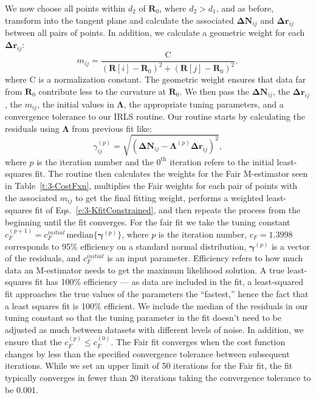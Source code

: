 We now choose all points within $d_2$ of $\mathbf{R}_0$, where $d_2 > d_1$, and as before, transform into the tangent plane and calculate the associated $\mathbf{\Delta N}_{ij}$ and $\mathbf{\Delta r}_{ij}$ between all pairs of points.
In addition, we calculate a geometric weight for each $\mathbf{\Delta r}_{ij}$:
\begin{equation}
  m_{ij} = \frac{\textrm{C}} {(\mathbf{R}[i] - \mathbf{R}_0)^2 + (\mathbf{R}[j]-\mathbf{R}_0)^2},
\end{equation}
where $\textrm{C}$ is a normalization constant.
The geometric weight ensures that data far from $\mathbf{R}_0$ contribute less to the curvature at $\mathbf{R}_0$.
We then pass the $\mathbf{\Delta N}_{ij}$, the $\mathbf{\Delta r}_{ij}$, the $m_{ij}$, the initial values in $\bm{\Lambda}$, the appropriate tuning parameters, and a convergence tolerance to our IRLS routine.
Our routine starts by calculating the residuals using $\bm{\Lambda}$ from previous fit like:
\begin{equation}
  \gamma_{ij}^{(p)} = \sqrt{(\mathbf{\Delta N}_{ij}- \mathbf{\Lambda}^{(p)} \mathbf{\Delta r}_{ij})^2},
\end{equation}
where $p$ is the iteration number and the $0^{\textrm{th}}$ iteration refers to the initial least-squares fit.
The routine then calculates the weights for the Fair M-estimator seen in Table~\ref{t:3-CostFxn}, multiplies the Fair weights for each pair of points with the associated $m_{ij}$ to get the final fitting weight, performs a weighted least-squares fit of Eqs.~\ref{e:3-KfitConstrained}, and then repeats the process from the beginning until the fit converges.
For the fair fit we take the tuning constant $c_F^{(p+1)} = c_F^{initial} \, \textrm{median}\{ \bm{\gamma}^{(p)} \}$, where $p$ is the iteration number, $c_F = 1.3998$ corresponds to 95\% efficiency on a standard normal distribution, $\bm{\gamma}^{(p)}$ is a vector of the residuals, and $c_F^{initial}$ is an input parameter.
Efficiency refers to how much data an M-estimator needs to get the maximum likelihood solution.
A true least-squares fit has 100\% efficiency --- as data are included in the fit, a least-squared fit approaches the true values of the parameters the ``fastest,'' hence the fact that a least squares fit is 100\% efficient.
We include the median of the residuals in our tuning constant so that the tuning parameter in the fit doesn't need to be adjusted as much between datasets with different levels of noise.
In addition, we ensure that the $c_F^{(p)} \leq c_F^{(0)}$.
The Fair fit converges when the cost function changes by less than the specified convergence tolerance between subsequent iterations.
While we set an upper limit of 50 iterations for the Fair fit, the fit typically converges in fewer than 20 iterations taking the convergence tolerance to be 0.001.\\

